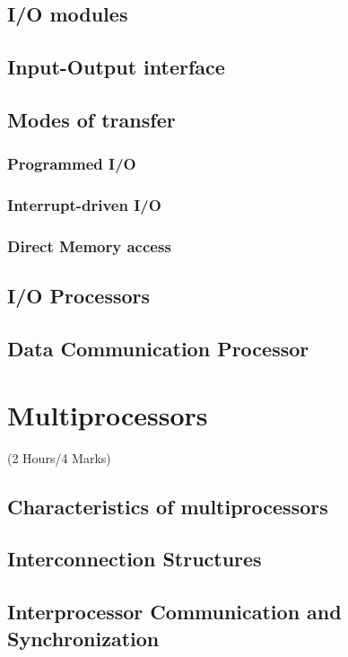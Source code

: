 \documentclass[12pt]{article}
\begin{document}
\subsection{I/O modules}
\subsection{Input-Output interface}
\subsection{Modes of transfer}
\subsubsection{Programmed I/O}
\subsubsection{Interrupt-driven I/O}
\subsubsection{Direct Memory access}
\subsection{I/O Processors}
\subsection{Data Communication Processor}

\pagebreak
\section{Multiprocessors}
\begin{center}(2 Hours/4 Marks)\end{center}
\subsection{Characteristics of multiprocessors}
\subsection{Interconnection Structures}
\subsection{Interprocessor Communication and Synchronization}
\end{document}
